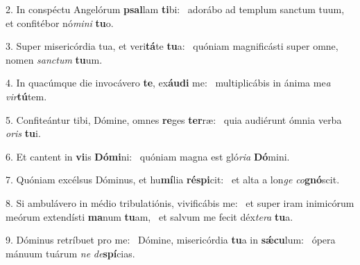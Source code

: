 2. In conspéctu Angelórum \textbf{psal}lam \textbf{ti}bi: \ast\  adorábo ad templum sanctum tuum, et confitébor nó\textit{mi}\textit{ni} \textbf{tu}o.\

3. Super misericórdia tua, et veri\textbf{tá}te \textbf{tu}a: \ast\  quóniam magnificásti super omne, nomen \textit{sanc}\textit{tum} \textbf{tu}um.\

4. In quacúmque die invocávero \textbf{te}, ex\textbf{áu}\textbf{di} me: \ast\  multiplicábis in ánima me\textit{a} \textit{vir}\textbf{tú}tem.\

5. Confiteántur tibi, Dómine, omnes \textbf{re}ges \textbf{ter}ræ: \ast\  quia audiérunt ómnia verba \textit{o}\textit{ris} \textbf{tu}i.\

6. Et cantent in \textbf{vi}is \textbf{Dó}\textbf{mi}ni: \ast\  quóniam magna est gló\textit{ri}\textit{a} \textbf{Dó}mini.\

7. Quóniam excélsus Dóminus, et hu\textbf{mí}lia \textbf{ré}\textbf{spi}cit: \ast\  et alta a lon\textit{ge} \textit{co}\textbf{gnó}scit.\

8. Si ambulávero in médio tribulatiónis, vivificábis me: \dag\  et super iram inimicórum meórum extendísti \textbf{ma}num \textbf{tu}am, \ast\  et salvum me fecit déx\textit{te}\textit{ra} \textbf{tu}a.\

9. Dóminus retríbuet pro me: \dag\  Dómine, misericórdia \textbf{tu}a in \textbf{sǽ}\textbf{cu}lum: \ast\  ópera mánuum tuárum \textit{ne} \textit{de}\textbf{spí}cias.\


